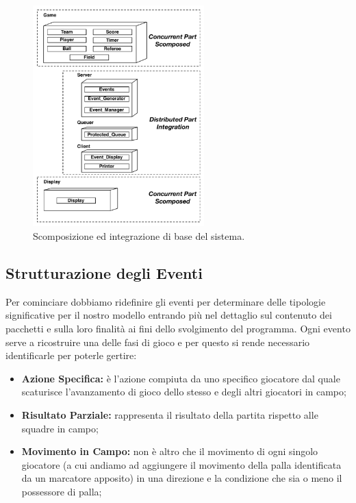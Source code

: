 \documentclass[aps,letterpaper,10pt]{article}
\begin{document}
\begin{figure}[H]
	\begin{center}
		\includegraphics[width=250px]{images/integration-basic.pdf}
	\end{center}
\caption{Scomposizione ed integrazione di base del sistema.}
\end{figure}


\subsection{Strutturazione degli Eventi} %
\label{sub:strutturazione_degli_eventi}

Per cominciare dobbiamo ridefinire gli eventi per determinare delle tipologie significative per il nostro modello entrando più nel dettaglio sul contenuto dei pacchetti e sulla loro finalit\`a ai fini dello svolgimento del programma. Ogni evento serve a ricostruire una delle fasi di gioco e per questo si rende necessario identificarle per poterle gertire: 

\begin{itemize}
	\item \textbf{Azione Specifica:} \`e l'azione compiuta da uno specifico giocatore dal quale scaturisce l'avanzamento di gioco dello stesso e degli altri giocatori in campo;
	\item \textbf{Risultato Parziale:} rappresenta il risultato della partita rispetto alle squadre in campo;
	\item \textbf{Movimento in Campo:} non \`e altro che il movimento di ogni singolo giocatore (a cui andiamo ad aggiungere il movimento della palla identificata da un marcatore apposito) in una direzione e la condizione che sia o meno il possessore di palla;
\end{itemize}
\end{document}
